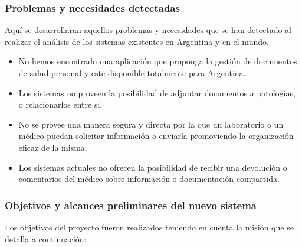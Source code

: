 \subsubsection{Problemas y necesidades detectadas}
Aquí se desarrollaran aquellos problemas y necesidades que se han detectado al realizar el análisis de los sistemas existentes en Argentina y en el mundo.
	\begin{itemize}

     \item No hemos encontrado una aplicación que proponga la gestión de documentos de salud personal y este disponible totalmente para Argentina.
     
     \item Los sistemas no proveen la posibilidad de adjuntar documentos a patologías, o relacionarlos entre si.
     
     \item No se provee una manera segura y directa por la que un laboratorio o un médico puedan solicitar información o enviarla promoviendo la organización eficaz de la misma. 
     
     \item Los sistemas actuales no ofrecen la posibilidad de recibir una devolución o comentarios del médico sobre información o documentación compartida.


     


\end{itemize}

\clearpage
\subsubsection{Objetivos y alcances preliminares del nuevo sistema}

Los objetivos del proyecto fueron realizados teniendo en cuenta la misión que se detalla a continuación:

